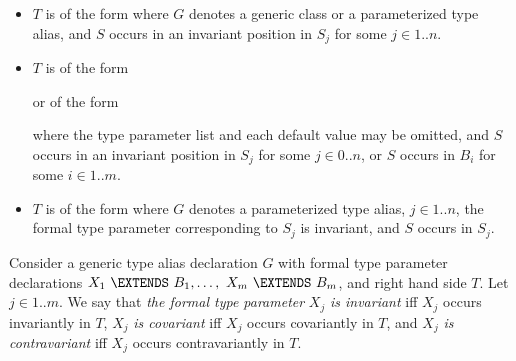 \documentclass{article}
\begin{document}
\begin{itemize}
\item $T$ is of the form 
  where $G$ denotes a generic class or a parameterized type alias,
  and $S$ occurs in an invariant position in $S_j$ for some $j \in 1 .. n$.

\item $T$ is of the form



  \noindent
  or of the form



  \noindent
  where the type parameter list and each default value may be omitted,
  and $S$ occurs in an invariant position in $S_j$
  for some $j \in 0 .. n$,
  or $S$ occurs in $B_i$
  for some $i \in 1 .. m$.

\item $T$ is of the form 
  where $G$ denotes a parameterized type alias,
  $j \in 1 .. n$,
  the formal type parameter corresponding to $S_j$ is invariant,
  and $S$ occurs in $S_j$.
\end{itemize}

\LMHash{}
Consider a generic type alias declaration $G$
with formal type parameter declarations
$X_1\ \EXTENDS\ B_1, \ldots,\ X_m\ \EXTENDS\ B_m$,
and right hand side $T$.
Let $j \in 1 .. m$.
%
We say that {\em the formal type parameter} $X_j$ {\em is invariant}
if{}f $X_j$ occurs invariantly in $T$,
$X_j$ {\em is covariant} if{}f $X_j$ occurs covariantly in $T$,
and $X_j$ {\em is contravariant} if{}f $X_j$ occurs contravariantly in $T$.

\end{document}
